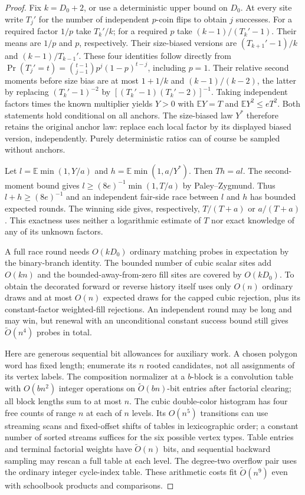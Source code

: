 \begin{proof}
Fix $k=D_0+2$, or use a deterministic upper bound on $D_0$.
At every site write $T_j'$ for the number of independent $p$-coin
flips to obtain $j$ successes. For a required factor $1/p$ take
$T_k'/k$; for a required $p$ take $(k-1)/(T_k'-1)$.
Their means are $1/p$ and $p$, respectively. Their size-biased
versions are $(T_{k+1}'-1)/k$ and $(k-1)/T_{k-1}'$.
These four identities follow directly from
$\Pr(T_j'=t)=\binom{t-1}{j-1}p^j(1-p)^{t-j}$, including $p=1$.
Their relative second moments before size bias are at most
$1+1/k$ and $(k-1)/(k-2)$, the latter by replacing
$(T_k'-1)^{-2}$ by $[(T_k'-1)(T_k'-2)]^{-1}$. Taking independent
factors times the known multiplier yields $Y>0$ with
$\mathbb E Y=T$ and $\mathbb E Y^2\le eT^2$. Both statements hold
conditional on all anchors. The size-biased law $Y^*$ therefore
retains the original anchor law: replace each local factor by its
displayed biased version, independently. Purely deterministic
ratios can of course be sampled without anchors.

Let $l=\mathbb E\min(1,Y/a)$ and $h=\mathbb E\min(1,a/Y^*)$.
Then $Th=al$. The second-moment bound gives
$l\ge(8e)^{-1}\min(1,T/a)$ by Paley--Zygmund. Thus $l+h\ge(8e)^{-1}$
and an independent fair-side race between $l$ and $h$ has bounded
expected rounds. The winning side gives, respectively, $T/(T+a)$
or $a/(T+a)$. This exactness uses neither a logarithmic estimate of
$T$ nor exact knowledge of any of its unknown factors.

A full race round needs $O(kD_0)$ ordinary matching probes in
expectation by the binary-branch identity. The bounded number of
cubic scalar sites add $O(kn)$ and the bounded-away-from-zero fill
sites are covered by $O(kD_0)$. To obtain the decorated forward or
reverse history itself uses only $O(n)$ ordinary draws and at most
$O(n)$ expected draws for the capped cubic rejection, plus its
constant-factor weighted-fill rejections. An independent round may
be long and may win, but renewal with an unconditional constant
success bound still gives $\widetilde O(n^4)$ probes in total.

Here are generous sequential bit allowances for auxiliary work.
A chosen polygon word has fixed length; enumerate its $n$ rooted
candidates, not all assignments of its vertex labels. The composition
normalizer at a $b$-block is a convolution table with $O(bn^2)$
integer operations on $\widetilde O(bn)$-bit entries after factorial
clearing; all block lengths sum to at most $n$. The cubic
double-color histogram has four free counts of range $n$ at each of
$n$ levels. Its $O(n^5)$ transitions can use streaming scans and
fixed-offset shifts of tables in lexicographic order; a constant
number of sorted streams suffices for the six possible vertex types.
Table entries and terminal factorial weights have
$\widetilde O(n)$ bits, and sequential backward sampling may rescan a
full table at each level. The degree-two overflow pair uses the
ordinary integer cycle-index table. These arithmetic costs fit
$\widetilde O(n^9)$ even with schoolbook products and comparisons.


\end{proof}
